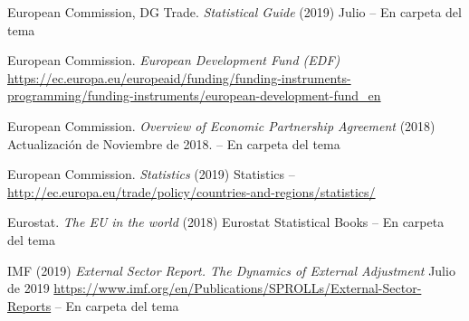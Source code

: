 \documentclass{nuevotema}
\begin{document}
European Commission, DG Trade. \textit{Statistical Guide} (2019) Julio -- En carpeta del tema

European Commission. \textit{European Development Fund (EDF)} \url{https://ec.europa.eu/europeaid/funding/funding-instruments-programming/funding-instruments/european-development-fund\_en}

European Commission. \textit{Overview of Economic Partnership Agreement} (2018) Actualización de Noviembre de 2018. -- En carpeta del tema

European Commission. \textit{Statistics} (2019) Statistics -- \url{http://ec.europa.eu/trade/policy/countries-and-regions/statistics/}

Eurostat. \textit{The EU in the world} (2018) Eurostat Statistical Books -- En carpeta del tema

IMF (2019) \textit{External Sector Report. The Dynamics of External Adjustment} Julio de 2019 \url{https://www.imf.org/en/Publications/SPROLLs/External-Sector-Reports} -- En carpeta del tema
\end{document}
